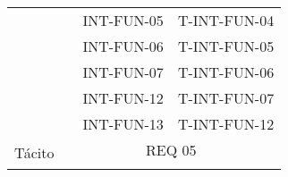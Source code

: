 \begin{table}[H]
\begin{tabular}{|l|llc|}
                                                       & \multicolumn{1}{l|}{}                                                                                                                                                                                                                             & \multicolumn{1}{l|}{INT-FUN-05}                   & T-INT-FUN-04                                       \\
                                                       & \multicolumn{1}{l|}{}                                                                                                                                                                                                                             & \multicolumn{1}{l|}{INT-FUN-06}                   & T-INT-FUN-05                                       \\
                                                       & \multicolumn{1}{l|}{}                                                                                                                                                                                                                             & \multicolumn{1}{l|}{INT-FUN-07}                   & T-INT-FUN-06                                       \\
                                                       & \multicolumn{1}{l|}{}                                                                                                                                                                                                                             & \multicolumn{1}{l|}{INT-FUN-12}                   & T-INT-FUN-07                                       \\
                                                       & \multicolumn{1}{l|}{}                                                                                                                                                                                                                             & \multicolumn{1}{l|}{INT-FUN-13}                   & T-INT-FUN-12                                       \\ \hline
\multirow{3}{*}{Tácito}                                & \multicolumn{3}{c|}{REQ 05}                                                                                                                                                                                                                                                                                                                                \\ \cline{2-4} 

\end{tabular}
\end{table}
